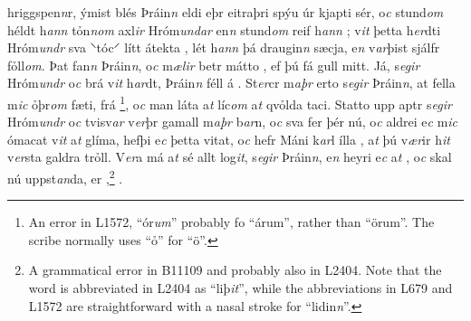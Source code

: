hriggspen\textit{n}r, ýmist  blés Þráin\textit{n} eldi
eþr eitraþri spýu úr kjapti sér, 
o\textit{c} stund\textit{om} héldt h\textit{ann} tỏn\textit{n}\textit{om}  axl\textit{ir} Hróm\textit{undar} 
en\textit{n} stund\textit{om} reif h\textit{ann} ; 
v\textit{it} þetta  
h\textit{er}dti  Hróm\textit{undr} sva   ⸌tóc⸍ lítt    átekta   ,  lét h\textit{ann} þá draugin\textit{n} sæcja, e\textit{n}  v\textit{ar}þist   sjálfr   fỏll\textit{om}. 
Þat  fan\textit{n} Þráin\textit{n}, o\textit{c} m\textit{ælir}
betr mátto  , ef þú   fá gull mitt. Já, s\textit{egir} Hróm\textit{undr} o\textit{c} brá
v\textit{it} h\textit{ar}dt,   Þráin\textit{n} féll á  . 
St\textit{er}cr m\textit{aþr} erto s\textit{egir} Þráin\textit{n}, at
fella m\textit{ic}  ỏþr\textit{om} fæti, 
 frá  \footnote{
	An error in L1572, \enquote{ór\textit{um}} probably fo  \enquote{árum}, rather than \enquote{örum}. The scribe normally uses \enquote{ỏ} for \enquote{ö}.}, 
o\textit{c} man láta a\textit{t} líc\textit{om} a\textit{t} qvỏlda taci. 
Statto upp aptr  s\textit{egir} Hróm\textit{undr} o\textit{c}
tvisv\textit{ar} v\textit{er}þr gamall m\textit{aþr} b\textit{ar}n,
o\textit{c} sva fer  þér nú, 
o\textit{c} aldrei   e\textit{c} m\textit{ic}  ómacat v\textit{it}  a\textit{t} glíma, hefþi e\textit{c} þetta vitat, o\textit{c} hefr
Máni k\textit{ar}l ílla  , a\textit{t} þú v\textit{ær}ir h\textit{it} v\textit{er}sta galdra trỏll.
V\textit{er}a  má a\textit{t}  sé allt log\textit{it}, s\textit{egir} Þráin\textit{n}, e\textit{n} heyri
e\textit{c} a\textit{t}  , o\textit{c} skal nú uppst\textit{an}da,     er  ,\footnote{A grammatical error in B11109 and probably also in L2404. Note that the word is abbreviated in L2404 as \enquote{liþ\textit{it}}, while the abbreviations in L679 and L1572 are straightforward with a nasal stroke for \enquote{lidin\textit{n}}.}  . 
